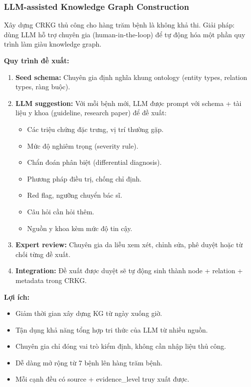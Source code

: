 \documentclass[12pt,a4paper]{article}
\begin{document}
\subsubsection{LLM-assisted Knowledge Graph Construction}

Xây dựng CRKG thủ công cho hàng trăm bệnh là không khả thi. Giải pháp: dùng LLM hỗ trợ chuyên gia (human-in-the-loop) để tự động hóa một phần quy trình làm giàu knowledge graph.

\textbf{Quy trình đề xuất:}

\begin{enumerate}
    \item \textbf{Seed schema:} Chuyên gia định nghĩa khung ontology (entity types, relation types, ràng buộc).
    \item \textbf{LLM suggestion:} Với mỗi bệnh mới, LLM được prompt với schema + tài liệu y khoa (guideline, research paper) để đề xuất:
    \begin{itemize}
        \item Các triệu chứng đặc trưng, vị trí thường gặp.
        \item Mức độ nghiêm trọng (severity rule).
        \item Chẩn đoán phân biệt (differential diagnosis).
        \item Phương pháp điều trị, chống chỉ định.
        \item Red flag, ngưỡng chuyển bác sĩ.
        \item Câu hỏi cần hỏi thêm.
        \item Nguồn y khoa kèm mức độ tin cậy.
    \end{itemize}
    \item \textbf{Expert review:} Chuyên gia da liễu xem xét, chỉnh sửa, phê duyệt hoặc từ chối từng đề xuất.
    \item \textbf{Integration:} Đề xuất được duyệt sẽ tự động sinh thành node + relation + metadata trong CRKG.
\end{enumerate}

\textbf{Lợi ích:}
\begin{itemize}
    \item Giảm thời gian xây dựng KG từ ngày xuống giờ.
    \item Tận dụng khả năng tổng hợp tri thức của LLM từ nhiều nguồn.
    \item Chuyên gia chỉ đóng vai trò kiểm định, không cần nhập liệu thủ công.
    \item Dễ dàng mở rộng từ 7 bệnh lên hàng trăm bệnh.
    \item Mỗi cạnh đều có source + evidence\_level truy xuất được.
\end{itemize}
\end{document}
